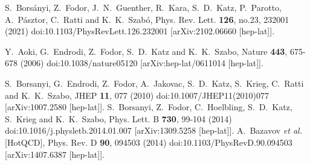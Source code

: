 \documentclass[a4paper,11pt]{article}
\begin{document}
%
% 
%
%
\begin{thebibliography}{}
%
%
S.~Bors\'anyi, Z.~Fodor, J.~N.~Guenther, R.~Kara, S.~D.~Katz, P.~Parotto, A.~P\'asztor, C.~Ratti and K.~K.~Szab\'o,
Phys. Rev. Lett. \textbf{126}, no.23, 232001 (2021)
doi:10.1103/PhysRevLett.126.232001
[arXiv:2102.06660 [hep-lat]].

Y.~Aoki, G.~Endrodi, Z.~Fodor, S.~D.~Katz and K.~K.~Szabo,
Nature \textbf{443}, 675-678 (2006)
doi:10.1038/nature05120
[arXiv:hep-lat/0611014 [hep-lat]].

S.~Borsanyi, G.~Endrodi, Z.~Fodor, A.~Jakovac, S.~D.~Katz, S.~Krieg, C.~Ratti and K.~K.~Szabo,
JHEP \textbf{11}, 077 (2010)
doi:10.1007/JHEP11(2010)077
[arXiv:1007.2580 [hep-lat]].
S.~Borsanyi, Z.~Fodor, C.~Hoelbling, S.~D.~Katz, S.~Krieg and K.~K.~Szabo,
Phys. Lett. B \textbf{730}, 99-104 (2014)
doi:10.1016/j.physletb.2014.01.007
[arXiv:1309.5258 [hep-lat]].
A.~Bazavov \textit{et al.} [HotQCD],
Phys. Rev. D \textbf{90}, 094503 (2014)
doi:10.1103/PhysRevD.90.094503
[arXiv:1407.6387 [hep-lat]].


\end{thebibliography}
\end{document}
